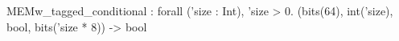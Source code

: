 MEMw_tagged_conditional : forall ('size : Int), 'size > 0. (bits(64), int('size), bool, bits('size * 8)) -> bool